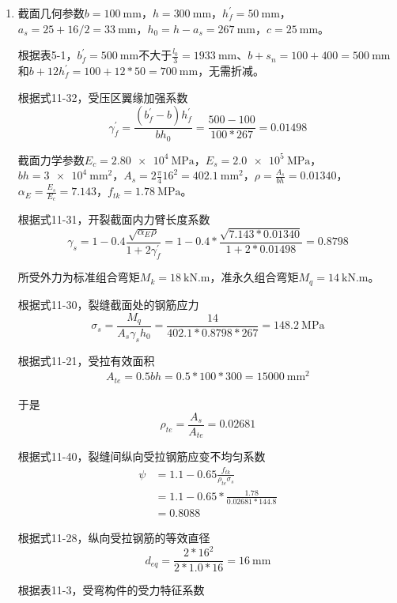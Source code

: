 \begin{enumerate}
    \item 截面几何参数$b=\SI{100}{\mm}$，$h=\SI{300}{\mm}$，$h_f^\prime=\SI{50}{\mm}$，$a_s = 25+16/2=\SI{33}{\mm}$，$h_0=h-a_s=\SI{267}{\mm}$，$c=\SI{25}{\mm}$。
          \par 根据表5-1，$b_f^\prime=\SI{500}{\mm}$不大于$\frac{l_0}{3}=\SI{1933}{\mm}$、$b+s_n=100+400=\SI{500}{\mm}$和$b+12h_f^\prime=100+12*50=\SI{700}{\mm}$，无需折减。
          \par 根据式11-32，受压区翼缘加强系数
          $$\gamma_f^\prime = \frac{(b_f^\prime - b) h_f^\prime}{b h_0} = \frac{500-100}{100*267} = 0.01498$$
          \par 截面力学参数$E_c = \SI{2.80e4}{\MPa}$，$E_s=\SI{2.0e5}{\MPa}$，$bh=\SI{3e4}{\mm^2}$，$A_s=2\frac{\pi}{4}16^2=\SI{402.1}{\mm^2}$，$\rho=\frac{A_s}{bh}=0.01340$，$\alpha_E=\frac{E_s}{E_c}=7.143$，$f_{tk}=\SI{1.78}{\MPa}$。
          \par 根据式11-31，开裂截面内力臂长度系数
          $$\gamma_s = 1 - 0.4\frac{\sqrt{\alpha_E\rho}}{1+2\gamma_f^\prime} = 1 - 0.4 * \frac{\sqrt{7.143*0.01340}}{1+2*0.01498} = 0.8798$$
          \par 所受外力为标准组合弯矩$M_k = \SI{18}{\kN.\m}$，准永久组合弯矩$M_q = \SI{14}{\kN.\m}$。
          \par 根据式11-30，裂缝截面处的钢筋应力
          $$\sigma_s = \frac{M_q}{A_s\gamma_sh_0} = \frac{14}{402.1*0.8798*267}=\SI{148.2}{\MPa}$$
          \par 根据式11-21，受拉有效面积
          \begin{align*}
              A_{te} = 0.5bh = 0.5*100*300 = \SI{15000}{\mm^2}
          \end{align*}
          \par 于是
          $$\rho_{te}=\frac{A_s}{A_{te}}=0.02681$$
          \par 根据式11-40，裂缝间纵向受拉钢筋应变不均匀系数
          \begin{align*}
              \psi & = 1.1 - 0.65 \frac{f_{tk}}{\rho_{te}\sigma_s} \\
                   & = 1.1-0.65*\frac{1.78}{0.02681*144.8}         \\
                   & = 0.8088
          \end{align*}
          \par 根据式11-28，纵向受拉钢筋的等效直径
          $$d_{eq}=\frac{2*16^2}{2*1.0*16}=\SI{16}{\mm}$$
          \par 根据表11-3，受弯构件的受力特征系数

\end{enumerate}
